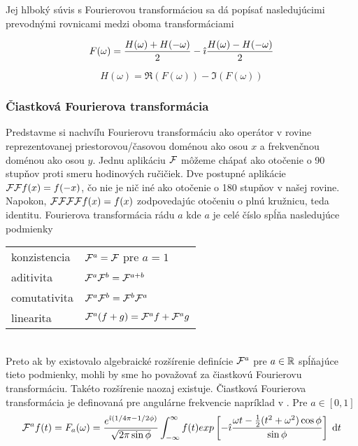 Jej hlboký súvis s Fourierovou transformáciou sa dá popísať
nasledujúcimi prevodnými rovnicami medzi oboma transformáciami

\begin{equation}
    F(\omega) = \frac{H(\omega)+H(-\omega)}{2} 
                -\hat{\imath} \frac{H(\omega) - H(-\omega)}{2}
\end{equation}

\begin{equation}
 H(\omega) = \Re(F(\omega)) - \Im(F(\omega))
\end{equation}

\subsubsection{Čiastková Fourierova transformácia}
Predstavme si nachvíľu Fourierovu transformáciu ako operátor
v rovine reprezentovanej priestorovou/časovou doménou ako osou $x$ a
frekvenčnou doménou ako osou $y$.
Jednu aplikáciu $\mathcal{F}$ môžeme chápať ako otočenie o 90 stupňov
proti smeru hodinových ručičiek.
Dve postupné aplikácie $\mathcal{F}\mathcal{F} f(x) = f(-x)$, čo nie je nič
iné ako otočenie o 180 stupňov v našej rovine. Napokon,
$\mathcal{F}\mathcal{F}\mathcal{F}\mathcal{F} f(x) = f(x)$ zodpovedajúc otočeniu o
plnú kružnicu, teda identitu.
Fourierova transformácia rádu $a$ kde $a$ je celé číslo spĺňa
nasledujúce podmienky \\
{\centering
\begin{tabular}{l l}
    konzistencia& $\mathcal{F}^a = \mathcal{F}$ pre $a=1$ \\
    aditivita& $\mathcal{F}^a \mathcal{F}^b = \mathcal{F}^{a+b}$ \\
    comutativita & $\mathcal{F}^a \mathcal{F}^b = \mathcal{F}^b \mathcal{F}^a$ \\
    linearita& $\mathcal{F}^a(f+g) = \mathcal{F}^a f + \mathcal{F}^a g$
\end{tabular}
}
\\
Preto ak by existovalo algebraické rozšírenie definície $\mathcal{F}^a$
pre $a\in {\mathbb R}$ spĺňajúce tieto
podmienky, mohli by sme ho považovať za čiastkovú Fourierovu
transformáciu. Takéto rozšírenie naozaj existuje.
Čiastková Fourierova transformácia je definovaná pre angulárne
frekvencie napríklad v \cite{saxsin}.
Pre $a\in[0,1]$ 
\begin{equation}
    \mathcal{F}^a f(t) = F_a(\omega) =
        \frac{e^{\hat{\imath}( 1/4 \pi - 1/2 \phi)}}{\sqrt{2\pi \sin \phi}}
        \int_{-\infty}^{\infty} f(t) exp\left[ 
            -\hat{\imath} \frac{\omega t - \frac{1}{2}( t^2 + \omega^2)
            \cos\phi }{\sin \phi}
        \right] \; \mathrm{d} t
    \label{eq:fractional_fourier}
\end{equation}

